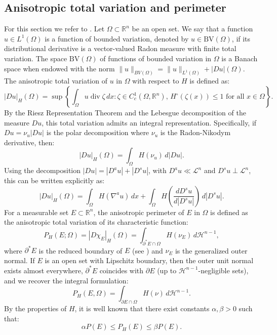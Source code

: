 \documentclass[oneside,a4paper,12pt,notitlepage]{article}
\theoremstyle{definition}
\newcommand{\R}{\mathbb{R}}
\newcommand{\BV}{\text{BV}}
\DeclareMathOperator{\divg}{div}
\begin{document}
\subsection{Anisotropic total variation and perimeter}
For this section we refer to \cite{amar,ambrosio2000functions, fusco_cianchi,maggi2012sets}.
Let $\Omega \subset \R^n$ be an open set. We say that a function $u \in L^1(\Omega)$ is a function of bounded variation, denoted by $u \in \BV(\Omega)$, if its distributional derivative is a vector-valued Radon measure with finite total variation. The space $\BV(\Omega)$ of functions of bounded variation in $\Omega$ is a Banach space when endowed with the norm $\|u\|_{BV(\Omega)}=\|u\|_{L^1(\Omega)}+|Du|(\Omega)$. 
The anisotropic total variation of $u$ in $\Omega$ with respect to $H$ is defined as:
\begin{equation} \label{eq:aniso_TV_def}
    |Du|_H(\Omega) = \sup \left\{ \int_\Omega u \divg \zeta \, dx : \zeta \in C^1_c(\Omega, \R^n), \, H^\circ(\zeta(x)) \leq 1 \text{ for all } x \in \Omega \right\}.
\end{equation}
By the Riesz Representation Theorem and the Lebesgue decomposition of the measure $Du$, this total variation admits an integral representation. Specifically, if $Du = \nu_u |Du|$ is the polar decomposition where $\nu_u$ is the Radon-Nikodym derivative, then:
\begin{equation} \label{eq:aniso_TV_integral}
    |Du|_H(\Omega) = \int_\Omega H(\nu_u) \, d|Du|.
\end{equation}
Using the decomposition
$|Du| = |D^au| + |D^su|$, with $D^au\ll \mathcal{L}^{n}$ and  $D^su \perp \mathcal{L}^{n}$, this can be written explicitly as:
\[
    |Du|_H(\Omega) = \int_\Omega H(\nabla^a u) \, dx + \int_\Omega H\left(\frac{d D^s u}{d |D^s u|}\right) \, d|D^s u|.
\]
For a measurable set $E \subset \R^n$, the anisotropic perimeter of $E$ in $\Omega$ is defined as the anisotropic total variation of its characteristic function:
\[
    P_H(E; \Omega) = |D\chi_E|_H(\Omega) = \int_{\partial^* E \cap \Omega} H(\nu_E) \, d\mathcal{H}^{n-1},
\]
where $\partial^* E$ is the reduced boundary of $E$ (see \cite{evans2015measure}) and $\nu_E$ is the generalized outer normal.
If $E$ is an open set with Lipschitz boundary, then the outer unit normal exists almost everywhere, $\partial^* E$ coincides with $\partial E$ (up to $\mathcal{H}^{n-1}$-negligible sets), and we recover the integral formulation:
\begin{equation}
P_H(E,\Omega) = \int_{\partial E \cap \Omega} H(\nu )\,d\mathcal{H}^{n-1}.
\end{equation}
By the properties of $H$, it is well known that there exist constants $\alpha, \beta > 0$ such that:
\begin{equation*}
\alpha P(E) \le P_H(E)\le \beta P(E).
\end{equation*}
\end{document}
